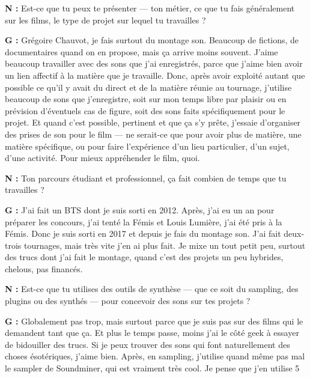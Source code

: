 ﻿\documentclass[12pt]{article}
\begin{document}
\textbf{N :} Est-ce que tu peux te présenter — ton métier, ce que tu fais généralement sur les films, le type de projet sur lequel tu travailles ? 

\textbf{G :} Grégoire Chauvot, je fais surtout du montage son. Beaucoup de fictions, de documentaires quand on en propose, mais ça arrive moins souvent. J'aime beaucoup travailler avec des sons que j'ai enregistrés, parce que j'aime bien avoir un lien affectif à la matière que je travaille. Donc, après avoir exploité autant que possible ce qu'il y avait du direct et de la matière réunie au tournage, j'utilise beaucoup de sons que j'enregistre, soit sur mon temps libre par plaisir ou en prévision d'éventuels cas de figure, soit des sons faits spécifiquement pour le projet. Et quand c'est possible, pertinent et que ça s'y prête, j'essaie d'organiser des prises de son pour le film — ne serait-ce que pour avoir plus de matière, une matière spécifique, ou pour faire l'expérience d'un lieu particulier, d'un sujet, d'une activité. Pour mieux appréhender le film, quoi. 

\textbf{N :} Ton parcours étudiant et professionnel, ça fait combien de temps que tu travailles ? 

\textbf{G :} J'ai fait un BTS dont je suis sorti en 2012. Après, j'ai eu un an pour préparer les concours, j'ai tenté la Fémis et Louis Lumière, j'ai été pris à la Fémis. Donc je suis sorti en 2017 et depuis je fais du montage son. J'ai fait deux-trois tournages, mais très vite j'en ai plus fait. Je mixe un tout petit peu, surtout des trucs dont j'ai fait le montage, quand c'est des projets un peu hybrides, chelous, pas financés. 

\textbf{N :} Est-ce que tu utilises des outils de synthèse — que ce soit du sampling, des plugins ou des synthés — pour concevoir des sons sur tes projets ? 

\textbf{G :} Globalement pas trop, mais surtout parce que je suis pas sur des films qui le demandent tant que ça. Et plus le temps passe, moins j'ai le côté geek à essayer de bidouiller des trucs. Si je peux trouver des sons qui font naturellement des choses ésotériques, j'aime bien. Après, en sampling, j'utilise quand même pas mal le sampler de Soundminer, qui est vraiment très cool. Je pense que j'en utilise 5%
\end{document}
